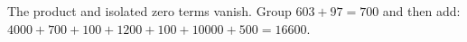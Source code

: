 The product and isolated zero terms vanish. Group $603+97=700$ and then add: $4000+700+100+1200+100+10000+500=\boxed{16600}$.
